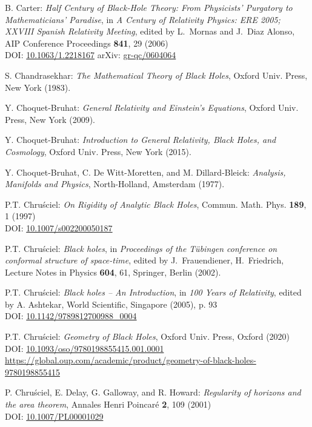 \begin{thebibliography}{123}
B. Carter:
{\em Half Century of Black‐Hole Theory: From Physicists' Purgatory to Mathematicians' Paradise},
in {\em A Century of Relativity Physics: ERE 2005; XXVIII Spanish Relativity Meeting},
edited by L.~Mornas and J.~Diaz Alonso,
AIP Conference Proceedings {\bf 841}, 29 (2006)\\
DOI: \href{https://doi.org/10.1063/1.2218167}{10.1063/1.2218167}\hfill
arXiv: \href{https://arxiv.org/abs/gr-qc/0604064}{gr-qc/0604064}

S. Chandrasekhar: {\em The Mathematical Theory of Black Holes},
Oxford Univ. Press, New York (1983).

Y. Choquet-Bruhat: {\em General Relativity and Einstein's Equations},
Oxford Univ. Press, New York (2009).

Y. Choquet-Bruhat: {\em Introduction to General Relativity, Black Holes, and
Cosmology}, Oxford Univ. Press, New York (2015).

Y. Choquet-Bruhat, C. De Witt-Moretten, and M. Dillard-Bleick:
{\em Analysis, Manifolds and Physics},
North-Holland, Amsterdam (1977).

P.T. Chru\'sciel: {\em On Rigidity of Analytic Black Holes},
Commun. Math. Phys. {\bf 189}, 1 (1997) \\
DOI: \href{https://doi.org/10.1007/s002200050187}{10.1007/s002200050187}

P.T. Chru\'sciel: {\em Black holes},
in {\em Proceedings of the T\"ubingen conference on conformal structure of
space-time}, edited by J.~Frauendiener, H.~Friedrich,
Lecture Notes in Physics {\bf 604}, 61,
Springer, Berlin (2002).

P.T. Chru\'sciel: {\em Black holes -- An Introduction},
in {\em 100 Years of Relativity}, edited by A. Ashtekar,
World Scientific, Singapore (2005), p. 93\\
DOI: \href{https://doi.org/10.1142/9789812700988_0004}{10.1142/9789812700988\_0004}

P.T. Chru\'sciel: {\em Geometry of Black Holes},
Oxford Univ. Press, Oxford (2020)\\
DOI: \href{https://doi.org/10.1093/oso/9780198855415.001.0001}{10.1093/oso/9780198855415.001.0001}\\
{\footnotesize \url{https://global.oup.com/academic/product/geometry-of-black-holes-9780198855415}}

P. Chru\'sciel, E. Delay, G. Galloway, and R. Howard:
{\em Regularity of horizons and the area theorem},
Annales Henri Poincar\'e {\bf 2}, 109 (2001)\\
DOI: \href{https://doi.org/10.1007/PL00001029}{10.1007/PL00001029}


\end{thebibliography}
